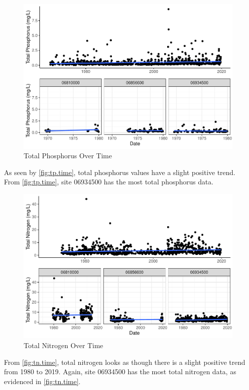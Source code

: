 \documentclass[12pt,]{article}
\begin{document}
\begin{figure}
\centering
\includegraphics{Project_Template_files/figure-latex/tp.time-1.pdf}
\caption{\label{fig:tp.time}Total Phosphorus Over Time}
\end{figure}

As seen by \autoref{fig:tp.time}, total phosphorus values have a slight
positive trend. From \autoref{fig:tp.time}, site 06934500 has the most
total phosphorus data.

\begin{figure}
\centering
\includegraphics{Project_Template_files/figure-latex/tn.time-1.pdf}
\caption{\label{fig:tn.time}Total Nitrogen Over Time}
\end{figure}

From \autoref{fig:tn.time}, total nitrogen looks as though there is a
slight positive trend from 1980 to 2019. Again, site 06934500 has the
most total nitrogen data, as evidenced in \autoref{fig:tn.time}.
\end{document}
